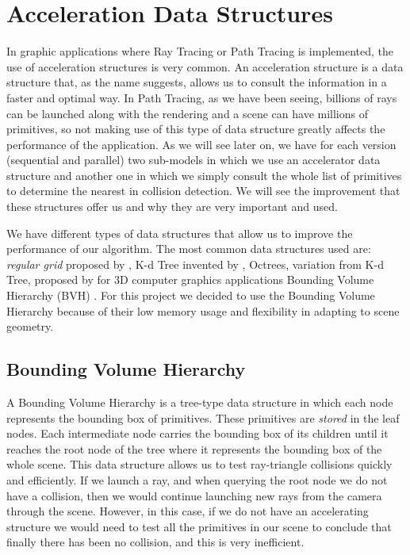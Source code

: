 \documentclass[titlepage,12pt]{report}
\begin{document}
\section{Acceleration Data Structures}

In graphic applications where Ray Tracing or Path Tracing is implemented, the use of acceleration structures is very common. An acceleration structure is a data structure that, as the name suggests, allows us to consult the information in a faster and optimal way. In Path Tracing, as we have been seeing, billions of rays can be launched along with the rendering and a scene can have millions of primitives, so not making use of this type of data structure greatly affects the performance of the application. As we will see later on, we have for each version (sequential and parallel) two sub-models in which we use an accelerator data structure and another one in which we simply consult the whole list of primitives to determine the nearest in collision detection. We will see the improvement that these structures offer us and why they are very important and used.

We have different types of data structures that allow us to improve the performance of our algorithm. The most common data structures used are: \textit{regular grid} proposed by \citep[pp.~12--26]{Fujimoto1986}, K-d Tree invented by \citep[p.~509--517]{Bentley1975}, Octrees, variation from K-d Tree, proposed by \citep{DonaldMeagher1982} for 3D computer graphics applications Bounding Volume Hierarchy (BVH) \citep{Gunther2007}. For this project we decided to use the Bounding Volume Hierarchy because of their low memory usage and flexibility in adapting to scene geometry.

\subsection{Bounding Volume Hierarchy}

A Bounding Volume Hierarchy is a tree-type data structure in which each node represents the bounding box of primitives. These primitives are \textit{stored} in the leaf nodes. Each intermediate node carries the bounding box of its children until it reaches the root node of the tree where it represents the bounding box of the whole scene. This data structure allows us to test ray-triangle collisions quickly and efficiently. If we launch a ray, and when querying the root node we do not have a collision, then we would continue launching new rays from the camera through the scene. However, in this case, if we do not have an accelerating structure we would need to test all the primitives in our scene to conclude that finally there has been no collision, and this is very inefficient.
\end{document}
